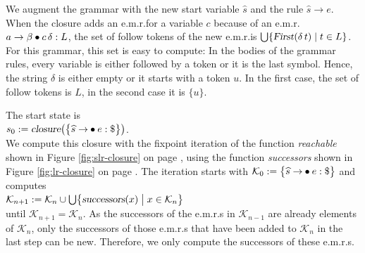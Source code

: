 \solutionEng
We augment the grammar with the new start variable $\widehat{s}$ and the rule $\widehat{s} \rightarrow e$.  When the
closure adds an e.m.r.\@ for a variable $c$ because of an e.m.r.\@ $a \rightarrow \beta \mdot c\, \delta: L$, the set
of follow tokens of the new e.m.r.\@ is $\bigcup\{\textsl{First}(\delta\,t) \mid t \in L\}$.  For this grammar, this
set is easy to compute:  In the bodies of the grammar rules, every variable is either followed by a token or it is
the last symbol.  Hence, the string $\delta$ is either empty or it starts with a token $u$.  In the first case, the
set of follow tokens is $L$, in the second case it is $\{u\}$.

The start state is
\\[0.2cm]
\hspace*{1.3cm}
$s_0 := \textsl{closure}\bigl(\bigl\{\widehat{s} \rightarrow \mdot e: \symbol{36}\bigr\}\bigr)$.
\\[0.2cm]
We compute this closure with the fixpoint iteration of the function \textsl{reachable} shown in Figure
\ref{fig:slr-closure} on page \pageref{fig:slr-closure}, using the function \textsl{successors} shown in Figure
\ref{fig:lr-closure} on page \pageref{fig:lr-closure}.  The iteration starts with
$\mathcal{K}_0 := \bigl\{\widehat{s} \rightarrow \mdot e: \symbol{36}\bigr\}$ and computes
\\[0.2cm]
\hspace*{1.3cm}
$\mathcal{K}_{n+1} := \mathcal{K}_n \cup \bigcup \bigl\{ \textsl{successors}(x) \bigm| x \in \mathcal{K}_n \bigr\}$
\\[0.2cm]
until $\mathcal{K}_{n+1} = \mathcal{K}_n$.  As the successors of the e.m.r.s in $\mathcal{K}_{n-1}$ are already
elements of $\mathcal{K}_n$, only the successors of those e.m.r.s that have been added to $\mathcal{K}_n$ in the
last step can be new.  Therefore, we only compute the successors of these e.m.r.s.
